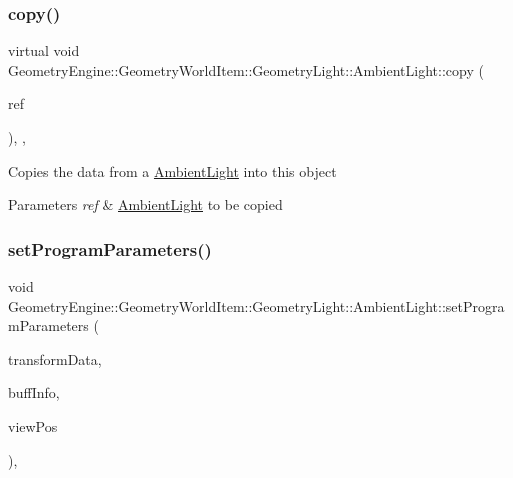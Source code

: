 \subsubsection{\texorpdfstring{copy()}{copy()}}
{\footnotesize\ttfamily virtual void Geometry\+Engine\+::\+Geometry\+World\+Item\+::\+Geometry\+Light\+::\+Ambient\+Light\+::copy (\begin{DoxyParamCaption}\item[{const \mbox{\hyperlink{class_geometry_engine_1_1_geometry_world_item_1_1_geometry_light_1_1_ambient_light}{Ambient\+Light}} \&}]{ref }\end{DoxyParamCaption})\hspace{0.3cm}{\ttfamily [inline]}, {\ttfamily [protected]}, {\ttfamily [virtual]}}

Copies the data from a \mbox{\hyperlink{class_geometry_engine_1_1_geometry_world_item_1_1_geometry_light_1_1_ambient_light}{Ambient\+Light}} into this object 
\begin{DoxyParams}{Parameters}
{\em ref} & \mbox{\hyperlink{class_geometry_engine_1_1_geometry_world_item_1_1_geometry_light_1_1_ambient_light}{Ambient\+Light}} to be copied \\
\hline
\end{DoxyParams}
\mbox{\label{class_geometry_engine_1_1_geometry_world_item_1_1_geometry_light_1_1_ambient_light_a1ba7a81ad6ccc571ec831892a5434734}} 
\subsubsection{\texorpdfstring{setProgramParameters()}{setProgramParameters()}}
{\footnotesize\ttfamily void Geometry\+Engine\+::\+Geometry\+World\+Item\+::\+Geometry\+Light\+::\+Ambient\+Light\+::set\+Program\+Parameters (\begin{DoxyParamCaption}\item[{const \mbox{\hyperlink{class_geometry_engine_1_1_lighting_transformation_data}{Lighting\+Transformation\+Data}} \&}]{transform\+Data,  }\item[{const \mbox{\hyperlink{class_geometry_engine_1_1_buffers_info}{Buffers\+Info}} \&}]{buff\+Info,  }\item[{const Q\+Vector3D \&}]{view\+Pos }\end{DoxyParamCaption})\hspace{0.3cm}{\ttfamily [protected]}, {\ttfamily [virtual]}}

